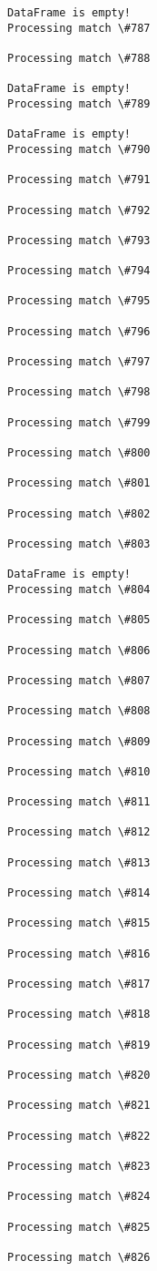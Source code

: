 \documentclass[11pt]{article}
\begin{document}
\begin{Verbatim}[commandchars=\\\{\}]
DataFrame is empty!
Processing match \#787

Processing match \#788

DataFrame is empty!
Processing match \#789

DataFrame is empty!
Processing match \#790

Processing match \#791

Processing match \#792

Processing match \#793

Processing match \#794

Processing match \#795

Processing match \#796

Processing match \#797

Processing match \#798

Processing match \#799

Processing match \#800

Processing match \#801

Processing match \#802

Processing match \#803

DataFrame is empty!
Processing match \#804

Processing match \#805

Processing match \#806

Processing match \#807

Processing match \#808

Processing match \#809

Processing match \#810

Processing match \#811

Processing match \#812

Processing match \#813

Processing match \#814

Processing match \#815

Processing match \#816

Processing match \#817

Processing match \#818

Processing match \#819

Processing match \#820

Processing match \#821

Processing match \#822

Processing match \#823

Processing match \#824

Processing match \#825

Processing match \#826


\end{Verbatim}
\end{document}
